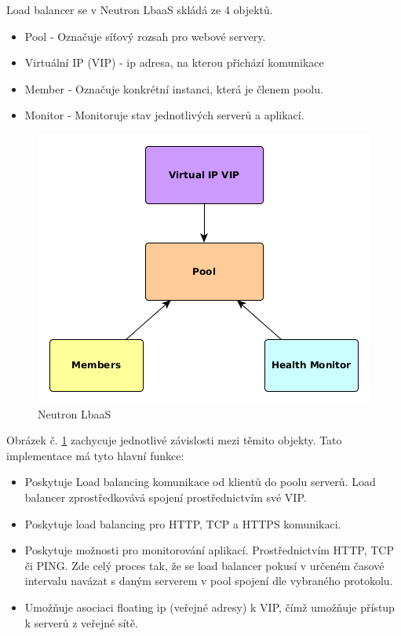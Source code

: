 Load balancer se v Neutron LbaaS skládá ze 4 objektů.

\begin{itemize}
\item Pool - Označuje síťový rozsah pro webové servery.
\item Virtuální IP (VIP) - ip adresa, na kterou přichází komunikace
\item Member - Označuje konkrétní instanci, která je členem poolu.
\item Monitor - Monitoruje stav jednotlivých serverů a aplikací.
\end{itemize}

\begin{figure}[h]
\begin{centering}
\includegraphics[scale=0.63]{images/NeutronLbaaS}
\par\end{centering}
\caption{Neutron LbaaS\label{fig:NeutronLbaaS}}
\end{figure}

Obrázek č. \ref{fig:NeutronLbaaS} zachycuje jednotlivé závislosti mezi těmito objekty. Tato implementace má tyto hlavní funkce:

\begin{itemize}
\item Poskytuje Load balancing komunikace od klientů do poolu serverů. Load balancer zprostředkovává spojení prostřednictvím své VIP.
\item Poskytuje load balancing pro HTTP, TCP a HTTPS komunikaci.
\item Poskytuje možnosti pro monitorování aplikací. Prostřednictvím HTTP, TCP či PING. Zde celý proces tak, že se load balancer pokusí v určeném časové intervalu navázat s daným serverem v pool spojení dle vybraného protokolu.
\item Umožňuje asociaci floating ip (veřejné adresy) k VIP, čímž umožňuje přístup k serverů z veřejné sítě.
\end{itemize}

